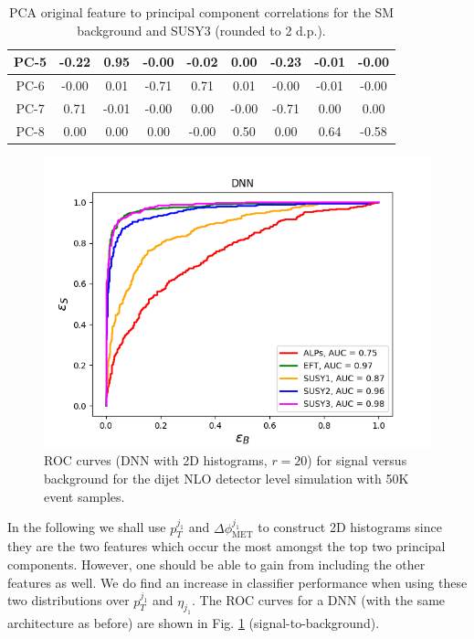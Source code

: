 \documentclass[prd,aps,letterpaper,floatfix,superscriptaddress,preprintnumbers,twocolumn,10pt,nofootinbib]{revtex4-1}
\begin{document}
\begin{table}
{\begin{tabular}{|c|c|c|c|c|c|c|c|c|}
PC-5 & -0.22 &  0.95 &  -0.00 &  -0.02 &   0.00 & -0.23 &     -0.01 &     -0.00 \\ \hline
PC-6 & -0.00 &  0.01 &  -0.71 &   0.71 &   0.01 & -0.00 &     -0.01 &     -0.00 \\ \hline
PC-7 &  0.71 & -0.01 &  -0.00 &   0.00 &  -0.00 & -0.71 &      0.00 &      0.00 \\ \hline
PC-8 &  0.00 &  0.00 &   0.00 &  -0.00 &   0.50 &  0.00 &      0.64 &     -0.58 \\ \hline
\bottomrule
\end{tabular}}
\caption{PCA original feature to principal component correlations for the SM background and SUSY3 (rounded to 2 d.p.).}\label{PCA_table1}
\end{table}

\begin{figure}%
\centering
\includegraphics[scale=0.50]{figures/2D_DNN_sig_vs_bg_delphes_pt-metphij1_ROC.png}
\caption{ROC curves (DNN with 2D histograms, $r = 20$) for signal versus background for the dijet NLO detector level simulation with 50K event samples.}\label{2D_DNN_sig_vs_bg_NLO_ROC}
\end{figure}


In the following we shall use $p_T^{j_1}$ and $\Delta \phi_{\text{MET}}^{j_1}$ to construct 2D histograms since they are the two features which occur the most amongst the top two principal components. However, one should be able to gain from including the other features as well. We do find an increase in classifier performance when using these two distributions over $p_T^{j_1}$ and $\eta_{j_1}$. The ROC curves for a DNN (with the same architecture as before) are shown in Fig. \ref{2D_DNN_sig_vs_bg_NLO_ROC} (signal-to-background).
\end{document}
